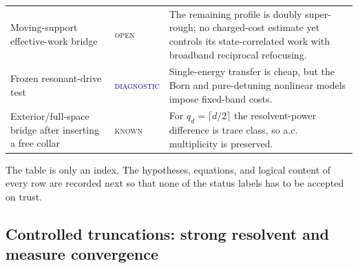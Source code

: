 \documentclass[11pt]{article}
\newcommand{\statusknown}{\textcolor{proved}{\textsc{known}}}
\newcommand{\statusopen}{\textcolor{open}{\textsc{open}}}
\newcommand{\statusdiagnostic}{\textcolor{navy}{\textsc{diagnostic}}}
\theoremstyle{definition}
\theoremstyle{remark}
\begin{document}
\begin{longtable}{>{\raggedright\arraybackslash}p{}>{\raggedright\arraybackslash}p{}>{\raggedright\arraybackslash}p{}}
Moving-support effective-work bridge & \statusopen & The remaining profile is doubly super-rough; no charged-cost estimate yet controls its state-correlated work with broadband reciprocal refocusing. \\
Frozen resonant-drive test & \statusdiagnostic & Single-energy transfer is cheap, but the Born and pure-detuning nonlinear models impose fixed-band costs. \\
Exterior/full-space bridge after inserting a free collar & \statusknown & For $q_d=\lceil d/2\rceil$ the resolvent-power difference is trace class, so a.c. multiplicity is preserved. \\
\bottomrule
\end{longtable}

The table is only an index.  The hypotheses, equations, and logical content of every row are recorded next so that none of the status labels has to be accepted on trust.

\subsection{Controlled truncations: strong resolvent and measure convergence}
\end{document}
